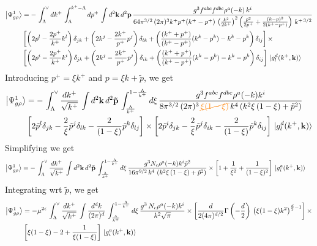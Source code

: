\documentclass[aps,prd,amsmath,amssymb,nofootinbib]{revtex4-2}
\numberwithin{equation}{section}
\begin{document}
\begin{align}
    \left|\Psi_{g\rho}^{1}\right\rangle & = -\, \int_{\Lambda}^{\vee} dk^{+}\, \int_{\Lambda}^{k^{+}-\Lambda} dp^{+}\, \int d^{2}\mathbf{k}\, d^{2}\mathbf{p}\,\frac{g^{3}f^{abc}f^{dbc}\rho^{a}(-k)\,k^{i}}{64\pi^{3/2}\,(2\pi)^{3}k^{+}p^{+}(k^{+}-p^{+})\,\left(\frac{k^{2}}{2k^{+}}\right)^{2}\left(\frac{p^{2}}{2p^{+}}+\frac{(k-p)^{2}}{2(k^{+}-p^{+})}\right)\,k^{+\,3/2}}\notag \\ & \left[\left(2p^{l}-\frac{2p^{+}}{k^{+}}k^{l}\right)\delta_{jk}+\left(2k^{j}-\frac{2k^{+}}{p^{+}} p^{j}\right)\delta_{lk}+\left(\frac{(k^{+}+p^{+})}{(k^{+}-p^{+})}(k^{k}-p^{k})-k^{k}-p^{k}\right)\delta_{lj}\right]\times \notag \\ & \left[\left(2p^{i}-\frac{2p^{+}}{k^{+}}k^{i}\right)\delta_{jk}+\left(2k^{j}-\frac{2k^{+}}{p^{+}} p^{j}\right)\delta_{ik}+\left(\frac{(k^{+}+p^{+})}{(k^{+}-p^{+})}(k^{k}-p^{k})-k^{k}-p^{k}\right)\delta_{ij}\right]\, \ket{g^{d}_{l}(k^{+},\mathbf{k})}
\end{align}
Introducing $p^{+} = \xi k^{+}$ and $p = \xi k +\tilde{p}$, we get
\begin{align}
    \left|\Psi_{g\rho}^{1}\right\rangle & = -\, \int_{\Lambda}^{\vee} \frac{dk^{+}}{\sqrt{k^{+}}}\,\int d^{2}\mathbf{k}\, d^{2}\mathbf{\tilde{p}}\, \int_{\frac{\Lambda}{k^{+}}}^{1-\frac{\Lambda}{k^{+}}} d\xi\, \frac{g^{3}f^{abc}f^{dbc}\rho^{a}(-k)k^{i}}{8\pi^{3/2}\,(2\pi)^{3}\, {\color{orange}\cancel{\xi(1-\xi)}}\,k^{4}\left(k^{2}\xi\,(1-\xi)+\tilde{p}^{2}\right)}\notag \\ & \left[2\tilde{p}^{l}\delta_{jk}-\frac{2}{\xi}\tilde{p}^{j}\delta_{lk}-\frac{2}{(1-\xi)}\tilde{p}^{k}\delta_{lj}\right] \times \left[2\tilde{p}^{i}\delta_{jk}-\frac{2}{\xi}\tilde{p}^{j}\delta_{ik}-\frac{2}{(1-\xi)}\tilde{p}^{k}\delta_{ij}\right]\, \ket{g^{d}_{l}(k^{+},\mathbf{k})}
\end{align}
Simplifying we get
\begin{align}
     \left|\Psi_{g\rho}^{1}\right\rangle & = -\, \int_{\Lambda}^{\vee} \frac{dk^{+}}{\sqrt{k^{+}}}\,\int d^{2}\mathbf{k}\, d^{2}\mathbf{\tilde{p}}\, \int_{\frac{\Lambda}{k^{+}}}^{1-\frac{\Lambda}{k^{+}}} d\xi\, \frac{g^{3}N_{c}\rho^{a}(-k)k^{i}\tilde{p}^{2}}{16\pi^{9/2}\, k^{4}\,\left(k^{2}\xi\,(1-\xi)+\tilde{p}^{2}\right)}\times \left[1+\frac{1}{\xi^{2}}+\frac{1}{(1-\xi)^{2}}\right]\,\ket{g^{a}_{i}(k^{+},\mathbf{k})}
\end{align}
Integrating wrt $\tilde{p}$, we get
\begin{align}
    \left|\Psi_{g\rho}^{1}\right\rangle & = -\mu^{2\epsilon}\, \int_{\Lambda}^{\vee} \frac{dk^{+}}{\sqrt{k^{+}}} \, \int \frac{d^{d}k}{(2\pi)^{d}}\, \int_{\frac{\Lambda}{k^{+}}}^{1-\frac{\Lambda}{k^{+}}} d\xi\, \frac{g^{3}\,N_{c}\rho^{a}(-k) k^{i}}{k^{2}\sqrt{\pi}}\times \left[\frac{d}{2(4\pi)^{d/2}}\Gamma\left(-\frac{d}{2}\right)\,\left(\xi(1-\xi)k^{2}\right)^{\frac{d}{2}-1}\right]\times\notag \\ &  \left[\xi(1-\xi)-2+\frac{1}{\xi(1-\xi)}\right]\,\ket{g^{a}_{i}(k^{+},\mathbf{k})}
\end{align}
\end{document}

